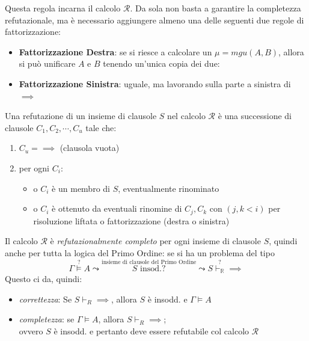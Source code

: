 Questa regola incarna il calcolo $\mathscr{R}$. Da sola non basta a garantire la completezza 
refutazionale, ma è necessario aggiungere almeno una delle seguenti due 
regole di fattorizzazione: 
\begin{itemize}
  \item \textbf{Fattorizzazione Destra}: se si riesce a calcolare un $\mu = mgu(A,B)$, allora si può unificare $A$ e $B$ tenendo un'unica copia dei due:
    \begin{prooftree}
    \end{prooftree}
  \item \textbf{Fattorizzazione Sinistra}: uguale, ma lavorando sulla parte a sinistra di $\implies$
    \begin{prooftree}
    \end{prooftree}
\end{itemize}

Una refutazione di un insieme di clausole $S$ nel calcolo $\mathscr{R}$ è una successione di clausole $C_1, C_2, \cdots, C_u$ tale che: 
\begin{enumerate}
  \item $C_u = \implies$ (clausola vuota)
  \item per ogni $C_i$:
    \begin{itemize}
      \item o $C_i$ è un membro di $S$, eventualmente rinominato
      \item o $C_i$ è ottenuto da eventuali rinomine di $C_j, C_k$ con $(j,k < i)$ per risoluzione liftata o fattorizzazione (destra o sinistra)
    \end{itemize}
\end{enumerate}
Il calcolo $\mathscr{R}$ è \textit{refutazionalmente completo} per ogni insieme di clausole $S$, quindi anche per tutta la logica del Primo Ordine: se si ha un problema del tipo
$$
\Gamma \stackrel{?}{\models} A \leadsto \stackrel {\text{insieme di clausole del Primo Ordine}} {S \text{ insod.?}} \leadsto S \stackrel ? {\vdash_\mathbb{R}} \implies
$$
Questo ci da, quindi:
\begin{itemize}
  \item \textit{correttezza}: Se $S \vdash_R \implies$, allora $S$ è insodd. e $\Gamma \models A$
  \item \textit{completezza}: se $\Gamma \models A$, allora $S \vdash_R \implies$; \\
  ovvero $S$ è insodd. e pertanto deve essere refutabile col calcolo $\mathscr{R}$
\end{itemize} 


